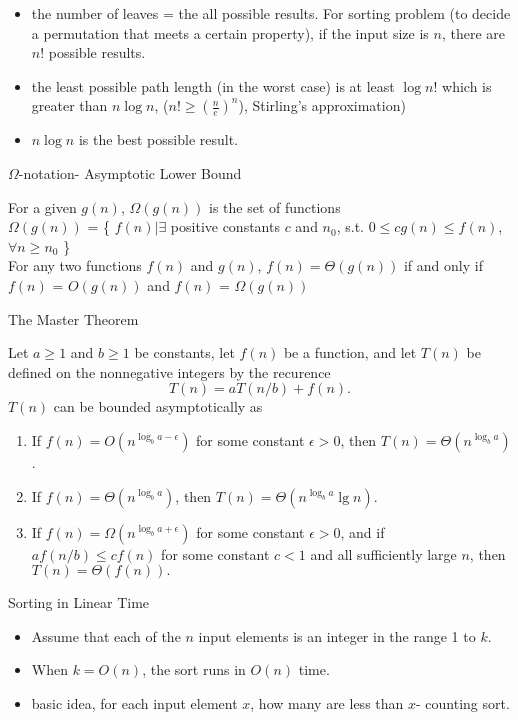 \documentclass{beamer}
\begin{document}
\begin{frame}{}
\begin{itemize}
\item the number of leaves = the all possible results.  For sorting problem
 (to decide a permutation that meets a certain property),
 if the input size is $n$, there are $n!$ possible results.
\item the least possible path length (in the worst case) is at least $\log n!$ which is greater than 
 $n \log n$, ($n!\ge (\frac{n}{e})^n$), Stirling's approximation)
\item $n\log n$ is the best possible result.
\end{itemize}
\end{frame}

\begin{frame}{}
\begin{center}
$\Omega$-notation- Asymptotic Lower Bound
\end{center}
For a given $g(n)$, $\Omega(g(n))$ is the set of functions \\
$\Omega(g(n))$ = \{ $f(n)|\exists $ positive constants $c$ and $n_0$, s.t.
$0\le cg(n)\le f(n)$, $\forall n\ge n_0$ \} \\
For any two functions $f(n)$ and $g(n)$, $f(n)=\Theta(g(n))$ if and only if
$f(n)$ = $O(g(n))$ and $f(n)$ = $\Omega(g(n))$
\end{frame}

\begin{frame}{}
\centerline{\large The Master Theorem}
Let $a\ge 1$ and $b\ge 1$ be constants, let $f(n)$ be a function, and let $T(n)$
 be defined on the nonnegative integers by the recurence 
$$T(n) = aT(n/b)+f(n).$$
$T(n)$ can be bounded asymptotically as 
\begin{enumerate}
\item If $f(n)=O(n^{\log_ba-\epsilon})$ for some constant $\epsilon>0$, then $T(n)=\Theta(n^{\log_ba})$.
\item If $f(n)=\Theta(n^{\log_ba})$, then $T(n)=\Theta(n^{\log_ba}\lg n)$.
\item If $f(n)=\Omega(n^{\log_ba+\epsilon})$ for some constant $\epsilon>0$, and if 
$af(n/b)\le cf(n)$ for some constant $c<1$ and all sufficiently large $n$, then $T(n)=\Theta(f(n)).$
\end{enumerate}
\end{frame}

\begin{frame}{}
\begin{center}
{\large Sorting in Linear Time}
\end{center}
\begin{itemize}
\item Assume that each of the $n$ input elements is an integer in the range
 1 to $k$.
\item When $k=O(n)$, the sort runs in $O(n)$ time.  
\item basic idea, for each input element $x$, how many are less than $x$- counting sort.
\end{itemize}
\end{frame}
\end{document}
